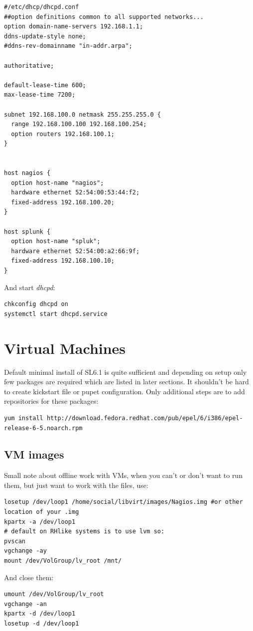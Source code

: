 \documentclass[10pt,a4paper,final]{report}
\begin{document}
\begin{lstlisting}
#/etc/dhcp/dhcpd.conf
##option definitions common to all supported networks...
option domain-name-servers 192.168.1.1;
ddns-update-style none;
#ddns-rev-domainname "in-addr.arpa";

authoritative;

default-lease-time 600;
max-lease-time 7200;

subnet 192.168.100.0 netmask 255.255.255.0 {
  range 192.168.100.100 192.168.100.254;
  option routers 192.168.100.1;
}


host nagios {
  option host-name "nagios";
  hardware ethernet 52:54:00:53:44:f2;
  fixed-address 192.168.100.20;
}

host splunk {
  option host-name "spluk";
  hardware ethernet 52:54:00:a2:66:9f;
  fixed-address 192.168.100.10;
}
\end{lstlisting}
And start \emph{dhcpd}:
\begin{lstlisting}
chkconfig dhcpd on
systemctl start dhcpd.service
\end{lstlisting}

\section{Virtual Machines}
Default minimal install of SL6.1 is quite sufficient and depending on setup only few packages are required which are listed in later sections. It shouldn't be hard to create kickstart file or pupet configuration. Only additional steps are to add repositories for these packages:
\begin{lstlisting}
yum install http://download.fedora.redhat.com/pub/epel/6/i386/epel-release-6-5.noarch.rpm
\end{lstlisting}
\subsection{VM images}
Small note about offline work with VMs, when you can't or don't want to run them, but just want to work with the files, use:
\begin{lstlisting}
losetup /dev/loop1 /home/social/libvirt/images/Nagios.img #or other location of your .img
kpartx -a /dev/loop1
# default on RHlike systems is to use lvm so:
pvscan
vgchange -ay
mount /dev/VolGroup/lv_root /mnt/
\end{lstlisting}
And close them:
\begin{lstlisting}
umount /dev/VolGroup/lv_root
vgchange -an
kpartx -d /dev/loop1
losetup -d /dev/loop1
\end{lstlisting}
\end{document}
